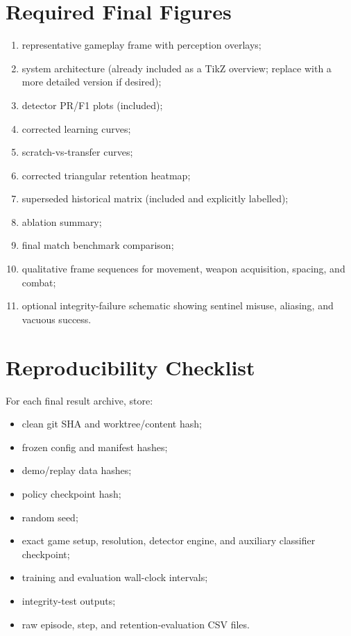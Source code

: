 \documentclass[11pt]{article}
\begin{document}
\section{Required Final Figures}
\begin{enumerate}[leftmargin=1.4em]
  \item representative gameplay frame with perception overlays;
  \item system architecture (already included as a TikZ overview; replace with a more detailed version if desired);
  \item detector PR/F1 plots (included);
  \item corrected learning curves;
  \item scratch-vs-transfer curves;
  \item corrected triangular retention heatmap;
  \item superseded historical matrix (included and explicitly labelled);
  \item ablation summary;
  \item final match benchmark comparison;
  \item qualitative frame sequences for movement, weapon acquisition, spacing, and combat;
  \item optional integrity-failure schematic showing sentinel misuse, aliasing, and vacuous success.
\end{enumerate}

\section{Reproducibility Checklist}
For each final result archive, store:
\begin{itemize}[leftmargin=1.4em]
  \item clean git SHA and worktree/content hash;
  \item frozen config and manifest hashes;
  \item demo/replay data hashes;
  \item policy checkpoint hash;
  \item random seed;
  \item exact game setup, resolution, detector engine, and auxiliary classifier checkpoint;
  \item training and evaluation wall-clock intervals;
  \item integrity-test outputs;
  \item raw episode, step, and retention-evaluation CSV files.
\end{itemize}
\end{document}
